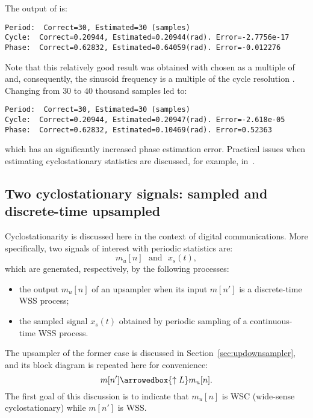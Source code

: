 The output of  is:
\begin{verbatim}
Period:  Correct=30, Estimated=30 (samples)
Cycle:  Correct=0.20944, Estimated=0.20944(rad). Error=-2.7756e-17
Phase:  Correct=0.62832, Estimated=0.64059(rad). Error=-0.012276
\end{verbatim}

Note that this relatively good result was obtained with  chosen as a multiple
of  and, consequently, the sinusoid frequency  is a multiple of the
cycle resolution . Changing  from $30$ to $40$ thousand samples led to:
\begin{verbatim}
Period:  Correct=30, Estimated=30 (samples)
Cycle:  Correct=0.20944, Estimated=0.20947(rad). Error=-2.618e-05
Phase:  Correct=0.62832, Estimated=0.10469(rad). Error=0.52363
\end{verbatim}
which has an significantly increased phase estimation error. Practical issues when
estimating cyclostationary statistics are discussed, for example, in~\cite{Antoni07}.
\eExample 

\subsection{Two cyclostationary signals: sampled and discrete-time upsampled}
\label{sec:cyclostationaritySampledUpsamples}

Cyclostationarity is discussed here in the context of digital communications. More
specifically, two signals of interest with periodic statistics are:
\begin{equation}
m_u[n] \textrm{~~and~~} x_s(t),
\label{eq:twoExamplesWSC}
\end{equation}
which are generated, respectively, by the following processes:
\begin{itemize}
	\item the output $m_u[n]$ of an upsampler when its input $m[n']$ is a discrete-time WSS process;
	\item the sampled signal $x_s(t)$ obtained by periodic sampling of a continuous-time WSS process.
\end{itemize}

The upsampler of the former case is discussed in Section~\ref{sec:updownsampler}, and its
block diagram is repeated here for convenience:
\[
m[n'] \arrowedbox{\uparrow{L}} m_u[n].
\] 
The first goal of this discussion is to indicate that $m_u[n]$ is WSC (wide-sense cyclostationary)
while $m[n']$ is WSS.

